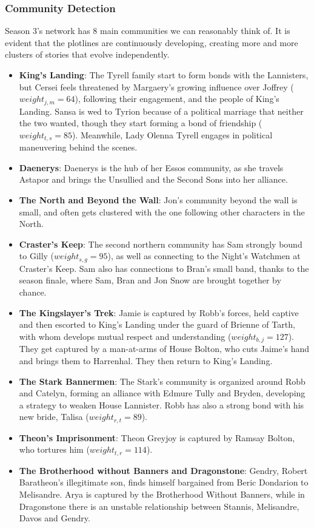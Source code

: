 \documentclass[10pt,twocolumn,letterpaper]{article}
\begin{document}
\subsubsection{Community Detection}

Season 3's network has 8 main communities we can reasonably think of. It is evident that the plotlines are continuously developing, creating more and more clusters of stories that evolve independently.

\begin{itemize}
    \item{\textbf{King's Landing}: The Tyrell family start to form bonds with the Lannisters, but Cersei feels threatened by Margaery's growing influence over Joffrey ($weight_{j,m}=64$), following their engagement, and the people of King's Landing. Sansa is wed to Tyrion because of a political marriage that neither the two wanted, though they start forming a bond of friendship ($weight_{t,s}=85$). Meanwhile, Lady Olenna Tyrell engages in political maneuvering behind the scenes.}
    \item \textbf{Daenerys}: Daenerys is the hub of her Essos community, as she travels Astapor and brings the Unsullied and the Second Sons into her alliance.
    \item \textbf{The North and Beyond the Wall}: Jon's community beyond the wall is small, and often gets clustered with the one following other characters in the North.
    \item \textbf{Craster's Keep}: The second northern community has Sam strongly bound to Gilly ($weight_{s,g}=95$), as well as connecting to the Night’s Watchmen at Craster’s Keep. Sam also has connections to Bran’s small band, thanks to the season finale, where Sam, Bran and Jon Snow are brought together by chance.
    \item \textbf{The Kingslayer's Trek}: Jamie is captured by Robb's forces, held captive and then escorted to King's Landing under the guard of Brienne of Tarth, with whom develops mutual respect and understanding ($weight_{b,j}=127$). They get captured by a man-at-arms of House Bolton, who cuts Jaime's hand and brings them to Harrenhal. They then return to King's Landing. 
    \item \textbf{The Stark Bannermen}: The Stark's community is organized around Robb and Catelyn, forming an alliance with Edmure Tully and Bryden, developing a strategy to weaken House Lannister. Robb has also a strong bond with his new bride, Talisa ($weight_{r,t}=89$).
    \item \textbf{Theon's Imprisonment}: Theon Greyjoy is captured by Ramsay Bolton, who tortures him ($weight_{t,r}=114$).
    \item \textbf{The Brotherhood without Banners and Dragonstone}: Gendry, Robert Baratheon's illegitimate son, finds himself bargained from Beric Dondarion to Melisandre. Arya is captured by the Brotherhood Without Banners, while in Dragonstone there is an unstable relationship between Stannis, Melisandre, Davos and Gendry. 
\end{itemize}
\end{document}
